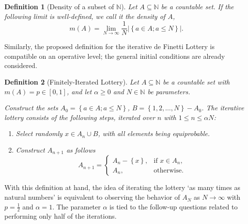 \documentclass{article}
\newtheorem{definition}{Definition}
\newcommand{\N}{\mathbb{N}}
\newcommand{\card}[1]{\left| #1 \right|}
\newcommand{\sset}[1]{\left\{ #1 \right\}}
\newcommand{\ppar}[1]{\left( #1 \right)}
\begin{document}
\begin{definition}[Density of a subset of $\N$]
Let $A \subseteq \N$ be a countable set.
If the following limit is well-defined, we call it the density of $A$,
\begin{equation}
    m\ppar{A} = 
    \lim_{N\rightarrow \infty} \frac{1}{N} \card{ \sset{a\in A; a\leq N} }.
\end{equation}
\end{definition}

Similarly, the proposed definition for the iterative de Finetti Lottery is compatible on an operative level; the general initial conditions are already considered.

\begin{definition}[Finitely-Iterated Lottery]
Let $A \subseteq \N$ be a countable set with $m\ppar{A} = p \in [0,1]$, and let $\alpha\geq 0$ and $N\in \N$ be parameters. 

Construct the sets $A_0 = \sset{a\in A; a\leq N}$, $B = \sset{1, 2, \dots, N} - A_0$.
%
The iterative lottery consists of the following steps, iterated over $n$ with $1\leq n\leq \alpha N$:
\begin{enumerate}
    \item Select randomly $x \in A_n \cup B$, with all elements being equiprobable.
    \item Construct $A_{n+1}$ as follows
    \begin{equation}
        A_{n+1} = \begin{cases}
            A_n-\sset{x}, &\text{if } x\in A_n, \\
            A_n, &\text{otherwise}.
        \end{cases}
    \end{equation}
\end{enumerate}
\end{definition}

With this definition at hand, the idea of iterating the lottery `as many times as natural numbers' is equivalent to observing the behavior of $A_{N}$ as $N \rightarrow \infty$ with $p=\frac{1}{2}$ and $\alpha=1$.
%
The parameter $\alpha$ is tied to the follow-up questions related to performing only half of the iterations.
\end{document}
